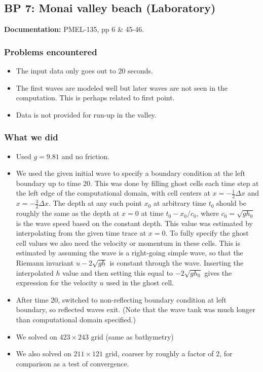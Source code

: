 
\subsection{BP 7:
 Monai valley beach (Laboratory)}

{\bf Documentation:}  PMEL-135, pp 6 \& 45-46.

\subsubsection{Problems encountered}

\begin{itemize}
\item The input data only goes out to 20 seconds.

\item The first waves are modeled well but later waves are not seen in the
computation.  This is perhaps related to first point.  

\item Data is not provided for run-up in the valley.
\end{itemize}

\subsubsection{What we did}

\begin{itemize}
\item Used $g=9.81$ and no friction.
\item We used the given initial wave to specify a boundary condition at the left
boundary up to time 20.  This was done by filling ghost cells each time step
at the left edge of the computational domain, with cell centers at $x = -
\frac 1 2 \Delta x$ and $x = -\frac 3 2 \Delta x$.
The depth at any such point $x_0$ at arbitrary time $t_0$ should be roughly
the same as the depth at $x=0$ at time $t_0 - x_0/c_0$, where $c_0 =
\sqrt{gh_0}$ is the wave speed based on the constant depth.  This value was
estimated by 
interpolating from the given time trace at $x=0$.
To fully specify the ghost cell values we also need the velocity or momentum
in these cells.  This is estimated by assuming the wave is a right-going
simple wave, so that the Riemann invariant $u - 2\sqrt{gh}$ is constant
through the wave.  Inserting the interpolated $h$ value and then setting this
equal to $-2\sqrt{gh_0}$ gives the expression for the velocity $u$ used in
the ghost cell.

\item After time 20, switched to non-reflecting boundary condition 
at left boundary, so reflected waves exit.  
(Note that the wave tank was much longer than computational domain specified.)
\item We solved on $423\times 243$ grid (same as bathymetry)
\item We also solved on $211\times 121$ grid, coarser by roughly a factor of
2, for comparison as a test of convergence.
\end{itemize} 

